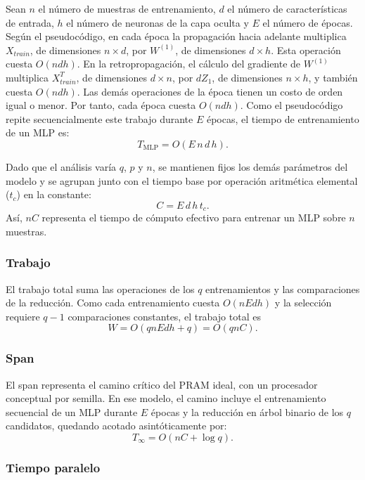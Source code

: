 \documentclass[11pt, a4paper]{article}
\begin{document}
Sean $n$ el número de muestras de entrenamiento, $d$ el número de características de entrada, $h$ el número de neuronas de la capa oculta y $E$ el número de épocas. Según el pseudocódigo, en cada época la propagación hacia adelante multiplica $X_{train}$, de dimensiones $n\times d$, por $W^{(1)}$, de dimensiones $d\times h$. Esta operación cuesta $O(ndh)$. En la retropropagación, el cálculo del gradiente de $W^{(1)}$ multiplica $X_{train}^{T}$, de dimensiones $d\times n$, por $dZ_1$, de dimensiones $n\times h$, y también cuesta $O(ndh)$. Las demás operaciones de la época tienen un costo de orden igual o menor. Por tanto, cada época cuesta $O(ndh)$. Como el pseudocódigo repite secuencialmente este trabajo durante $E$ épocas, el tiempo de entrenamiento de un MLP es:
\begin{equation}
T_{\mathrm{MLP}}=O(E\,n\,d\,h).
\label{eq:costo_mlp}
\end{equation}

Dado que el análisis varía $q$, $p$ y $n$, se mantienen fijos los demás parámetros del modelo y se agrupan junto con el tiempo base por operación aritmética elemental ($t_c$) en la constante:
\[
C=E\,d\,h\,t_c.
\]
Así, $nC$ representa el tiempo de cómputo efectivo para entrenar un MLP sobre $n$ muestras.

\subsubsection{Trabajo}

El trabajo total suma las operaciones de los $q$ entrenamientos y las comparaciones de la reducción. Como cada entrenamiento cuesta $O(nEdh)$ y la selección requiere $q-1$ comparaciones constantes, el trabajo total es
\[
W=O(qnEdh+q)=O(qnC).
\]

\subsubsection{Span}

El span representa el camino crítico del PRAM ideal, con un procesador conceptual por semilla. En ese modelo, el camino incluye el entrenamiento secuencial de un MLP durante $E$ épocas y la reducción en árbol binario de los $q$ candidatos, quedando acotado asintóticamente por:
\[
T_\infty = O(nC+\log q).
\]

\subsubsection{Tiempo paralelo}
\end{document}
